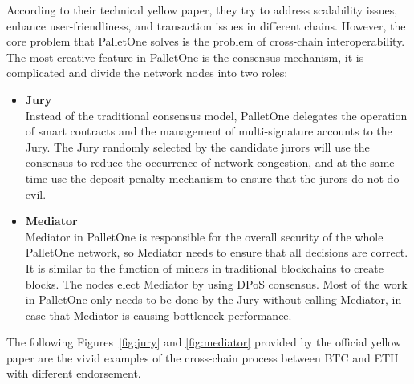 \noindent According to their technical yellow paper, they try to address scalability issues, enhance user-friendliness, and transaction issues in different chains. However, the core problem that PalletOne solves is the problem of cross-chain interoperability. The most creative feature in PalletOne is the consensus mechanism, it is complicated and divide the network nodes into two roles:
\begin{itemize}
    \item \textbf{Jury} \\
    Instead of the traditional consensus model, PalletOne delegates the operation of smart contracts and the management of multi-signature accounts to the Jury. The Jury randomly selected by the candidate jurors will use the consensus to reduce the occurrence of network congestion, and at the same time use the deposit penalty mechanism to ensure that the jurors do not do evil.
    \item \textbf{Mediator}\\
    Mediator in PalletOne is responsible for the overall security of the whole PalletOne network, so Mediator needs to ensure that all decisions are correct. It is similar to the function of miners in traditional blockchains to create blocks. The nodes elect Mediator by using DPoS consensus. Most of the work in PalletOne only needs to be done by the Jury without calling Mediator, in case that Mediator is causing bottleneck performance.
\end{itemize}
\noindent The following Figures~\ref{fig:jury} and \ref{fig:mediator} provided by the official yellow paper are the vivid examples of the cross-chain process between BTC and ETH with different endorsement.

